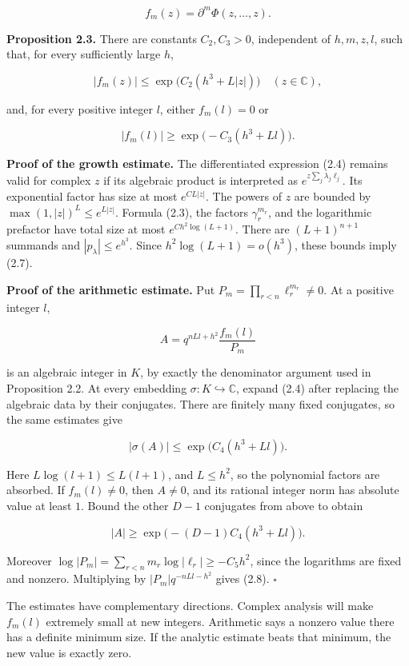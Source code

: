 \documentclass[
  11pt,
  a4paper,
]{article}
\begin{document}
\[
f_m(z)=\partial^m\Phi(z,\ldots,z).
\]

\textbf{Proposition 2.3.} There are constants \(C_2,C_3>0\), independent
of \(h,m,z,l\), such that, for every sufficiently large \(h\),

\[
|f_m(z)|\le\exp\bigl(C_2(h^3+L|z|)\bigr)\quad(z\in\mathbb C), \tag{2.7}
\]

and, for every positive integer \(l\), either \(f_m(l)=0\) or

\[
|f_m(l)|\ge\exp\bigl(-C_3(h^3+Ll)\bigr). \tag{2.8}
\]

\textbf{Proof of the growth estimate.} The differentiated expression
(2.4) remains valid for complex \(z\) if its algebraic product is
interpreted as \(e^{z\sum_j\lambda_j\ell_j}\). Its exponential factor
has size at most \(e^{C L|z|}\). The powers of \(z\) are bounded by
\(\max(1,|z|)^L\le e^{L|z|}\). Formula (2.3), the factors
\(\gamma_r^{m_r}\), and the logarithmic prefactor have total size at
most \(e^{C h^2\log(L+1)}\). There are \((L+1)^{n+1}\) summands and
\(|p_\lambda|\le e^{h^3}\). Since \(h^2\log(L+1)=o(h^3)\), these bounds
imply (2.7).

\textbf{Proof of the arithmetic estimate.} Put
\(P_m=\prod_{r<n}\ell_r^{m_r}\ne0\). At a positive integer \(l\),

\[
A=q^{nLl+h^2}\frac{f_m(l)}{P_m}
\]

is an algebraic integer in \(K\), by exactly the denominator argument
used in Proposition 2.2. At every embedding
\(\sigma:K\hookrightarrow\mathbb C\), expand (2.4) after replacing the
algebraic data by their conjugates. There are finitely many fixed
conjugates, so the same estimates give

\[
|\sigma(A)|\le\exp\bigl(C_4(h^3+Ll)\bigr).
\]

Here \(L\log(l+1)\le L(l+1)\), and \(L\le h^2\), so the polynomial
factors are absorbed. If \(f_m(l)\ne0\), then \(A\ne0\), and its
rational integer norm has absolute value at least \(1\). Bound the other
\(D-1\) conjugates from above to obtain

\[
|A|\ge\exp\bigl(-(D-1)C_4(h^3+Ll)\bigr).
\]

Moreover \(\log|P_m|=\sum_{r<n}m_r\log|\ell_r|\ge-C_5h^2\), since the
logarithms are fixed and nonzero. Multiplying by \(|P_m|q^{-nLl-h^2}\)
gives (2.8). \(\square\)

The estimates have complementary directions. Complex analysis will make
\(f_m(l)\) extremely small at new integers. Arithmetic says a nonzero
value there has a definite minimum size. If the analytic estimate beats
that minimum, the new value is exactly zero.
\end{document}
